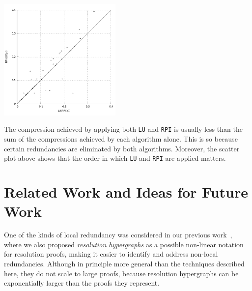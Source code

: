 \documentclass[envcountsame]{llncs}
\newcommand{\RPI}{\texttt{\upshape RPI}}
\newcommand{\LU}{\texttt{\upshape LU}}
\begin{document}

\smallskip

\centerline{\includegraphics[width=0.45\textwidth]{RPILUvsLURPI.pdf}}

\smallskip

The compression achieved by applying both {\LU} and {\RPI} is usually less than
the sum of the compressions achieved by each algorithm alone. This is so because
certain redundancies are eliminated by both algorithms. Moreover, the scatter plot
above shows that the order in which {\LU} and {\RPI} are applied matters. 




\section{Related Work and Ideas for Future Work}
\label{sec:related}

One of the kinds of local redundancy was considered in our previous
work~\cite{FontaineMerzPaleo2010Exploring-and-Exploiting-Algebraic-and-Graphical-Properties-of-Resolution},
where we also proposed \emph{resolution hypergraphs} as a possible non-linear
notation for resolution proofs, making it easier to identify and address
non-local redundancies. Although in principle more general than the techniques
described here, they do not scale to large proofs, because resolution
hypergraphs can be exponentially larger than the proofs they represent.
\end{document}
